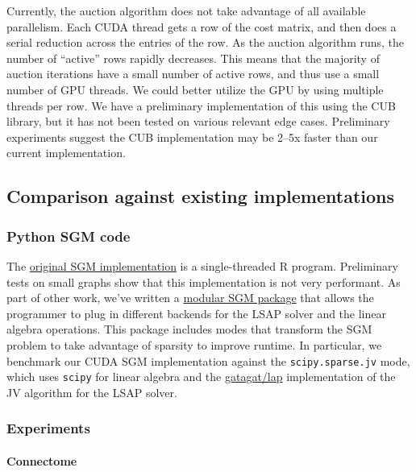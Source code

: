 \documentclass[10pt,oneside]{memoir}
\let\oldparagraph\paragraph
\renewcommand{\paragraph}[1]{\oldparagraph{#1}\mbox{}}
\begin{document}
Currently, the auction algorithm does not take advantage of all
available parallelism. Each CUDA thread gets a row of the cost matrix,
and then does a serial reduction across the entries of the row. As the
auction algorithm runs, the number of ``active'' rows rapidly decreases.
This means that the majority of auction iterations have a small number
of active rows, and thus use a small number of GPU threads. We could
better utilize the GPU by using multiple threads per row. We have a
preliminary implementation of this using the CUB library, but it has not
been tested on various relevant edge cases. Preliminary experiments
suggest the CUB implementation may be 2--5x faster than our current
implementation.

\hypertarget{comparison-against-existing-implementations-7}{%
\subsection{Comparison against existing
implementations}\label{comparison-against-existing-implementations-7}}

\hypertarget{python-sgm-code}{%
\subsubsection{Python SGM code}\label{python-sgm-code}}

The \href{https://github.com/youngser/VN/}{original SGM implementation}
is a single-threaded R program. Preliminary tests on small graphs show
that this implementation is not very performant. As part of other work,
we've written a \href{https://github.com/bkj/sgm}{modular SGM package}
that allows the programmer to plug in different backends for the LSAP
solver and the linear algebra operations. This package includes modes
that transform the SGM problem to take advantage of sparsity to improve
runtime. In particular, we benchmark our CUDA SGM implementation against
the \texttt{scipy.sparse.jv} mode, which uses \texttt{scipy} for linear
algebra and the \href{https://github.com/gatagat/lap}{gatagat/lap}
implementation of the JV algorithm for the LSAP solver.

\hypertarget{experiments-1}{%
\subsubsection{Experiments}\label{experiments-1}}

\hypertarget{connectome}{%
\paragraph{Connectome}\label{connectome}}
\end{document}
